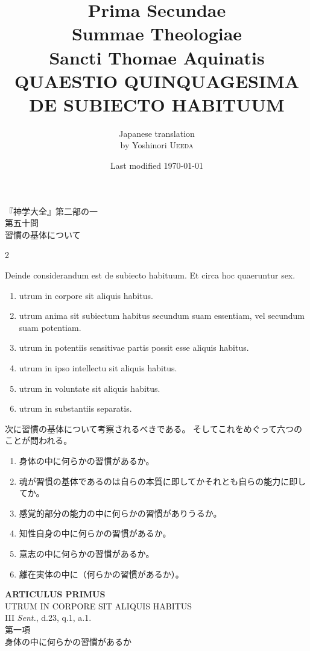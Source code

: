 \documentclass[paper=a4paper,fontsize=10pt,jafontsize=9pt,titlepage]{jlreq}
\title{{\bfseries Prima Secundae}\\{\Huge Summae Theologiae}\\Sancti Thomae
Aquinatis\\{\sffamily QUAESTIO QUINQUAGESIMA}\\{\bfseries DE SUBIECTO HABITUUM}}
\author{Japanese translation\\by Yoshinori {\scshape Ueeda}}
\date{Last modified \today}
\begin{document}
\maketitle
\thispagestyle{empty}
\begin{center}
{\Large 『神学大全』第二部の一\\第五十問\\習慣の基体について}
\end{center}


\begin{paracol}{2}

Deinde considerandum est de subiecto habituum. Et circa hoc quaeruntur
sex. 

\begin{enumerate}
 \item utrum in corpore sit aliquis habitus.
 \item utrum anima sit subiectum habitus secundum suam essentiam, vel secundum suam potentiam.
 \item utrum in potentiis sensitivae partis possit esse aliquis habitus.
 \item utrum in ipso intellectu sit aliquis habitus.
 \item utrum in voluntate sit aliquis habitus.
 \item utrum in substantiis separatis.
\end{enumerate}

\switchcolumn

次に習慣の基体について考察されるべきである。
そしてこれをめぐって六つのことが問われる。
\begin{enumerate}
 \item 身体の中に何らかの習慣があるか。
 \item 魂が習慣の基体であるのは自らの本質に即してかそれとも自らの能力に即してか。
 \item 感覚的部分の能力の中に何らかの習慣がありうるか。
 \item 知性自身の中に何らかの習慣があるか。
 \item 意志の中に何らかの習慣があるか。
 \item 離在実体の中に（何らかの習慣があるか）。
\end{enumerate}

\end{paracol}
\newpage
{}
{}
\setcounter{section}{1}
\setcounter{subsection}{0}
\begin{center}
{\Large {\bfseries ARTICULUS PRIMUS}}\\
{\large UTRUM IN CORPORE SIT ALIQUIS HABITUS}\\
{\footnotesize III {\itshape Sent.}, d.23, q.1, a.1.}\\
{\Large 第一項\\身体の中に何らかの習慣があるか}
\end{center}
\end{document}
